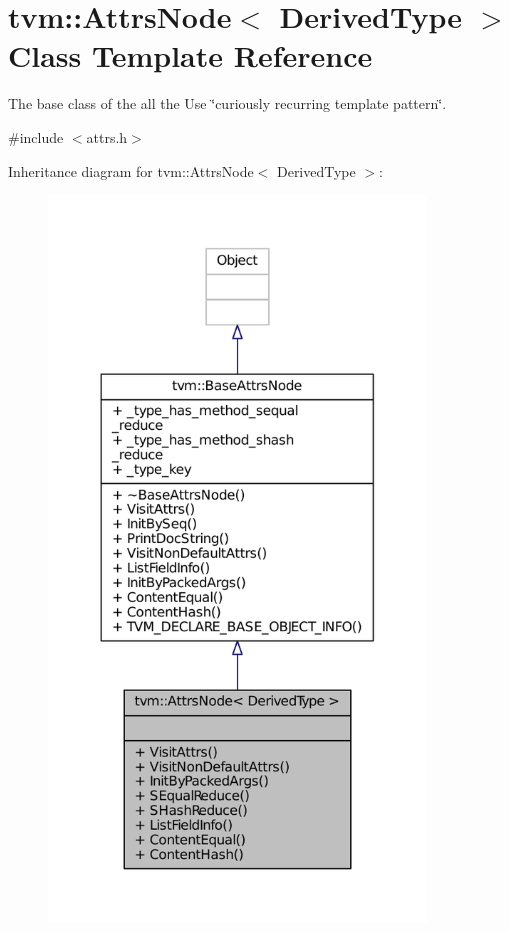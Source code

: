 \hypertarget{classtvm_1_1AttrsNode}{}\section{tvm\+:\+:Attrs\+Node$<$ Derived\+Type $>$ Class Template Reference}
\label{classtvm_1_1AttrsNode}


The base class of the all the Use \char`\"{}curiously recurring template pattern\char`\"{}.  




{\ttfamily \#include $<$attrs.\+h$>$}



Inheritance diagram for tvm\+:\+:Attrs\+Node$<$ Derived\+Type $>$\+:
\nopagebreak
\begin{figure}[H]
\begin{center}
\leavevmode
\includegraphics[width=284pt]{classtvm_1_1AttrsNode__inherit__graph}
\end{center}
\end{figure}


